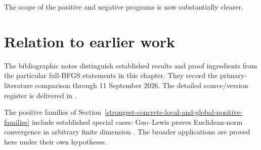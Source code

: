 The scope of the positive and negative programs is now substantially clearer.


\section*{Relation to earlier work}
The bibliographic notes distinguish established results and proof ingredients from the particular full-BFGS statements in this chapter. They record the primary-literature comparison through 11 September 2026. The detailed source/version register is delivered in .

The positive families of Section~\ref{strongest-concrete-local-and-global-positive-families} include established special cases: Guo--Lewis proves Euclidean-norm convergence in arbitrary finite dimension \cite[Corollary 4.2]{GL18}. The broader applications are proved here under their own hypotheses.

